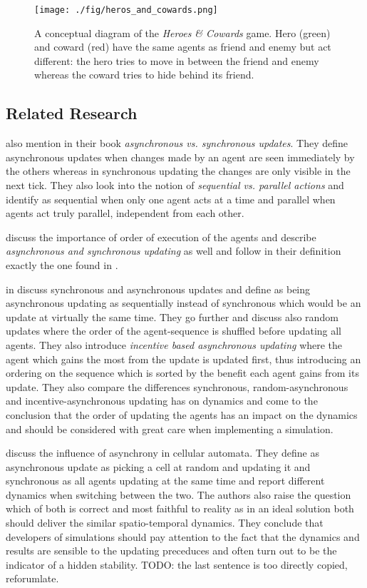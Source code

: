 \begin{figure}
	\centering
	\texttt{[image: ./fig/heros\_and\_cowards.png]}
	\caption{A conceptual diagram of the \textit{Heroes \& Cowards} game. Hero (green) and coward (red) have the same agents as friend and enemy but act different: the hero tries to move in between the friend and enemy whereas the coward tries to hide behind its friend.}
	\label{fig:heros_and_cowards}
\end{figure}

\subsection{Related Research}
\cite{wilensky_introduction_2015} also mention in their book \textit{asynchronous vs. synchronous updates}. They define asynchronous updates when changes made by an agent are seen immediately by the others whereas in synchronous updating the changes are only visible in the next tick. They also look into the notion of \textit{sequential vs. parallel actions} and identify as sequential when only one agent acts at a time and parallel when agents act truly parallel, independent from each other.

\cite{railsback_agent-based_2011} discuss the importance of order of execution of the agents and describe \textit{asynchronous and synchronous updating} as well and follow in their definition exactly the one found in \cite{wilensky_introduction_2015}.

\cite{page_incentives_1997} in discuss synchronous and asynchronous updates and define as being asynchronous updating as sequentially instead of synchronous which would be an update at virtually the same time. They go further and discuss also random updates where the order of the agent-sequence is shuffled before updating all agents. They also introduce \textit{incentive based asynchronous updating} where the agent which gains the most from the update is updated first, thus introducing an ordering on the sequence which is sorted by the benefit each agent gains from its update. They also compare the differences synchronous, random-asynchronous and incentive-asynchronous updating has on dynamics and come to the conclusion that the order of updating the agents has an impact on the dynamics and should be considered with great care when implementing a simulation.

\cite{bersini_asynchrony_1994} discuss the influence of asynchrony in cellular automata. They define as asynchronous update as picking a cell at random and updating it and synchronous as all agents updating at the same time and report different dynamics when switching between the two. The authors also raise the question which of both is correct and most faithful to reality as in an ideal solution both should deliver the similar spatio-temporal dynamics. They conclude that developers of simulations should pay attention to the fact that the dynamics and results are sensible to the updating preceduces and often turn out to be the indicator of a hidden stability. TODO: the last sentence is too directly copied, reforumlate.

